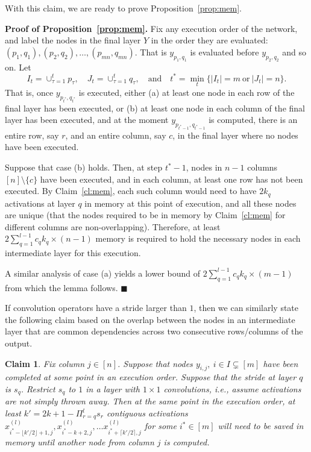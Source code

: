 \documentclass[10pt]{article}
\newtheorem{claim}{Claim}
\begin{document}
With this claim, we are ready to prove Proposition~\ref{prop:mem}.

\textbf{Proof of Proposition~\ref{prop:mem}.}
Fix any execution order of the network, and label the nodes in the
final layer $Y$ in the order they are evaluated: $(p_1, q_1), (p_2,
q_2), \dots, (p_{mn}, q_{mn})$. That is $y_{p_1, q_1}$ is evaluated
before $y_{p_2, q_2}$ and so on. Let
\[
I_t = \cup_{\tau=1}^{t} p_\tau,\quad
J_t = \cup_{\tau=1}^{t} q_\tau,\quad
\textrm{and}\quad
t^{*} =\min_t \{|I_t|=m \ \textrm{or}\ |J_t|=n\}.
\]
That is, once $y_{p_{t^{*}}, q_{t^{*}}}$ is executed, either (a) at
least one node in each row of the final layer has been executed, or
(b) at least one node in each column of the final layer has been
executed, and at the moment $y_{p_{t^{*}-1}, q_{t^{*}-1}}$ is
computed, there is an entire row, say $r$, and an entire column, say
$c$, in the final layer where no nodes have been executed.

Suppose that case (b) holds. Then, at step $t^{*}-1$, nodes in $n-1$
columns $[n]\setminus \{c\}$ have been executed, and in each column,
at least one row has not been executed. By Claim~\ref{cl:mem}, each such column
would need to have $2k_q$ activations at layer $q$ in memory at this point
of execution, and all these nodes are unique (that the nodes required
to be in memory by Claim~\ref{cl:mem} for different columns are non-overlapping).
Therefore, at least $2\sum_{q=1}^{l-1} c_q k_q \times (n-1)$ memory is required
to hold the necessary nodes in each intermediate layer for this execution.

A similar analysis of case (a) yields a lower bound of
$2\sum_{q=1}^{l-1} c_q k_q \times (m-1)$ from which the lemma follows.
\hfill $\blacksquare$

If convolution operators have a stride larger than $1$, then we can
similarly state the following claim based on the overlap between the
nodes in an intermediate layer that are common dependencies across two
consecutive rows/columns of the output.

\begin{claim}
\label{cl:mem-stride}
Fix column $j\in [n]$. Suppose that nodes $y_{i,j},\ i \in I\subsetneq
[m]$ have been completed at some point in an execution order. Suppose
that the stride at layer $q$ is $s_q$. Restrict $s_q$ to $1$ in a
layer with $1\times 1$ convolutions, i.e., assume activations are not
simply thrown away. Then at the same point in the execution order, at
least $k'=2k+1- \Pi_{r=q}^{l} s_r$ contiguous activations
$x^{(l)}_{i^{*}-\lfloor k'/2\rfloor +1 ,j}, x^{(l)}_{i^{*}-k+2,j},
\dots x^{(l)}_{i^{*}+\lceil k'/2\rceil,j}$ for some $i^{*}\in[m]$ will
need to be saved in memory until another node from column $j$ is
computed.
\end{claim}
\end{document}
